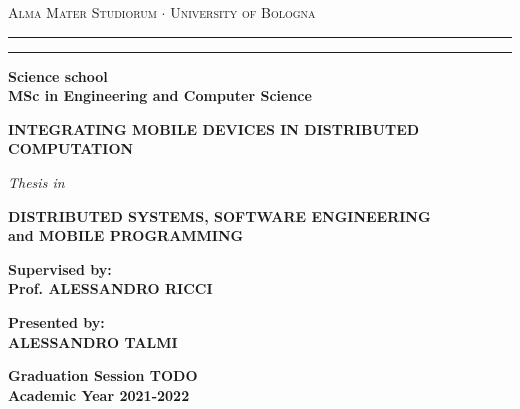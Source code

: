 \begin{titlepage}
    \begin{center}
    {{\Large{
        \textsc{Alma Mater Studiorum $\cdot$ University of Bologna}
    }}}
    \rule[0.1cm]{15.8cm}{0.1mm}
    \rule[0.5cm]{15.8cm}{0.6mm}
    {\small{\bf Science school\\ 
    MSc in Engineering and Computer Science }}
    \vspace{39mm}
    \end{center}
    \begin{center}
        \huge\bf INTEGRATING MOBILE DEVICES IN DISTRIBUTED COMPUTATION
    \end{center}
    \vspace{39mm}
    \begin{center}
    {{\emph{Thesis in}}}
    
    \vspace{1mm}
    {{\bf{DISTRIBUTED SYSTEMS, SOFTWARE ENGINEERING\\and MOBILE PROGRAMMING}}}
    \vspace{18mm}
    \end{center}
    \par
    \noindent
    \begin{minipage}[t]{0.47\textwidth}
    {\large{\bf Supervised by:\\
    Prof. ALESSANDRO RICCI}}
    \end{minipage}
    \hfill
    \begin{minipage}[t]{0.47\textwidth}\raggedleft
    {\large{\bf Presented by:\\
    ALESSANDRO TALMI}}
    \end{minipage}
    \vspace{20mm}
    \begin{center}
    {\large{\bf Graduation Session TODO\\
    Academic Year 2021-2022}}
    \end{center}
\end{titlepage}
